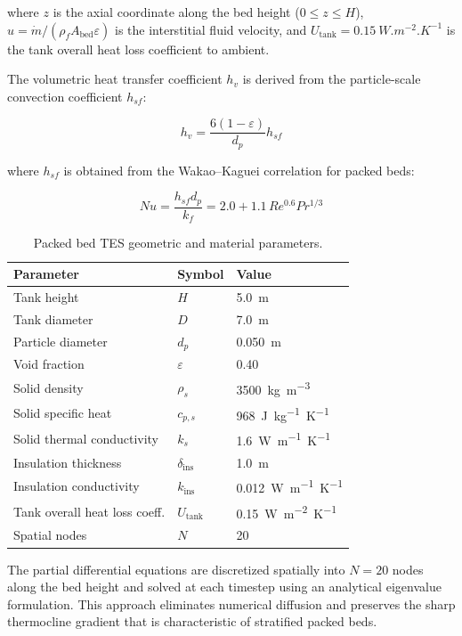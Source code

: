 \documentclass[11pt,review,3p]{elsarticle}
\begin{document}
where $z$ is the axial coordinate along the bed height ($0 \le z \le H$), $u = \dot{m} / (\rho_f A_{\text{bed}} \varepsilon)$ is the interstitial fluid velocity, and $U_{\text{tank}} = \SI{0.15}{W.m^{-2}.K^{-1}}$ is the tank overall heat loss coefficient to ambient.

The volumetric heat transfer coefficient $h_v$ is derived from the particle-scale convection coefficient $h_{sf}$:

\begin{equation}
    h_v = \frac{6 (1 - \varepsilon)}{d_p} h_{sf}
    \label{eq:hv}
\end{equation}

where $h_{sf}$ is obtained from the Wakao--Kaguei correlation for packed beds:

\begin{equation}
    Nu = \frac{h_{sf} d_p}{k_f} = 2.0 + 1.1\, Re^{0.6} Pr^{1/3}
    \label{eq:wakao}
\end{equation}

\begin{table}[h]
\centering
\caption{Packed bed TES geometric and material parameters.}
\label{tab:tes_params}
\begin{tabular}{lll}
\toprule
Parameter & Symbol & Value \\
\midrule
Tank height & $H$ & \SI{5.0}{m} \\
Tank diameter & $D$ & \SI{7.0}{m} \\
Particle diameter & $d_p$ & \SI{0.050}{m} \\
Void fraction & $\varepsilon$ & 0.40 \\
Solid density & $\rho_s$ & \SI{3500}{kg.m^{-3}} \\
Solid specific heat & $c_{p,s}$ & \SI{968}{J.kg^{-1}.K^{-1}} \\
Solid thermal conductivity & $k_s$ & \SI{1.6}{W.m^{-1}.K^{-1}} \\
Insulation thickness & $\delta_{\text{ins}}$ & \SI{1.0}{m} \\
Insulation conductivity & $k_{\text{ins}}$ & \SI{0.012}{W.m^{-1}.K^{-1}} \\
Tank overall heat loss coeff. & $U_{\text{tank}}$ & \SI{0.15}{W.m^{-2}.K^{-1}} \\
Spatial nodes & $N$ & 20 \\
\bottomrule
\end{tabular}
\end{table}

The partial differential equations are discretized spatially into $N = 20$ nodes along the bed height and solved at each timestep using an analytical eigenvalue formulation. This approach eliminates numerical diffusion and preserves the sharp thermocline gradient that is characteristic of stratified packed beds.
\end{document}
